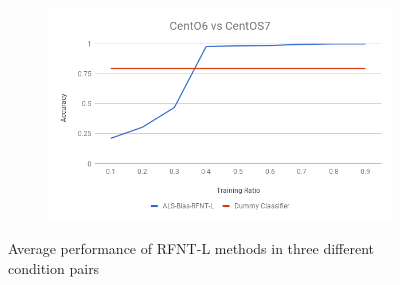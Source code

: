 \documentclass[10pt, conference, compsocconf]{IEEEtran}
\begin{document}
\begin{figure}[h!]
\begin{subfigure}[b]{0.8\linewidth}
                \includegraphics[width=\columnwidth]{figures/ALS-Bias/RFNT-L-ALS-Bias-6vs7-PFS}
        \end{subfigure}
        \caption{Average performance of RFNT-L methods in three different condition pairs}
        \label{fig:RFNT-L method}
\end{figure}
\end{document}
